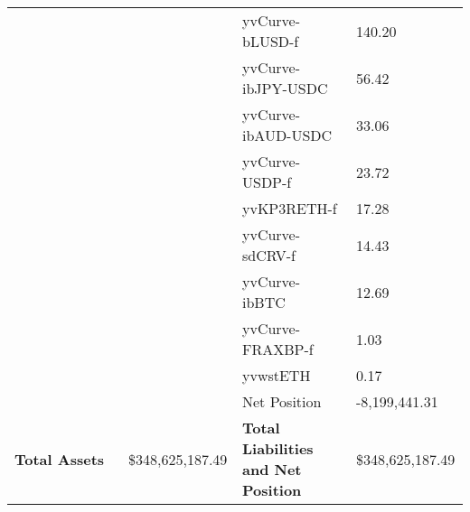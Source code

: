 \begin{longtable}{@{}p{0.25\linewidth}p{0.25\linewidth}p{0.25\linewidth}p{0.25\linewidth}@{}}
 &  & yvCurve-bLUSD-f & 140.20 \\
 &  & yvCurve-ibJPY-USDC & 56.42 \\
 &  & yvCurve-ibAUD-USDC & 33.06 \\
 &  & yvCurve-USDP-f & 23.72 \\
 &  & yvKP3RETH-f & 17.28 \\
 &  & yvCurve-sdCRV-f & 14.43 \\
 &  & yvCurve-ibBTC & 12.69 \\
 &  & yvCurve-FRAXBP-f & 1.03 \\
 &  & yvwstETH & 0.17 \\
 &  & Net Position & -8,199,441.31 \\

\midrule

\textbf{Total Assets} & \$348,625,187.49 & \textbf{Total Liabilities and Net Position} & \$348,625,187.49 \\

\bottomrule

\end{longtable}
